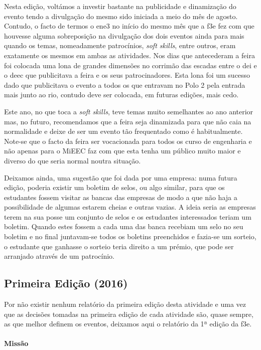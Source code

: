 Nesta edição, voltámos a investir bastante na publicidade e dinamização do evento tendo a divulgação do mesmo sido iniciada a meio do mês de agosto. Contudo, o facto de termos o \acrshort{ene3} no início do mesmo mês que a \acrshort{f3e} fez com que houvesse alguma sobreposição na divulgação dos dois eventos ainda para mais quando os temas, nomeadamente patrocínios, \textit{soft skills}, entre outros, eram exatamente os mesmos em ambas as atividades. Nos dias que antecederam a feira foi colocada uma lona de grandes dimensões no corrimão das escadas entre o \acrshort{dei} e o \acrshort{deec} que publicitava a feira e os seus patrocinadores. Esta lona foi um sucesso dado que publicitava o evento a todos os que entravam no Polo 2 pela entrada mais junto ao rio, contudo deve ser colocada, em futuras edições, mais cedo.

Este ano, no que toca a \textit{soft skills}, teve temas muito semelhantes ao ano anterior mas, no futuro, recomendamos que a feira seja dinamizada para que não caia na normalidade e deixe de ser um evento tão frequentado como é habitualmente. Note-se que o facto da feira ser vocacionada para todos os curso de engenharia e não apenas para o MiEEC faz com que esta tenha um público muito maior e diverso do que seria normal noutra situação.

Deixamos ainda, uma sugestão que foi dada por uma empresa: numa futura edição, poderia existir um boletim de selos, ou algo similar, para que os estudantes fossem visitar as bancas das empresas de modo a que não haja a possibilidade de algumas estarem cheias e outras vazias. A ideia seria as empresas terem na sua posse um conjunto de selos e os estudantes interessados teriam um boletim. Quando estes fossem a cada uma das banca recebiam um selo no seu boletim e no final juntavam-se todos os boletins preenchidos e fazia-se um sorteio, o estudante que ganhasse o sorteio teria direito a um prémio, que pode ser arranjado através de um patrocínio.

\subsection{Primeira Edição (2016)}

Por não existir nenhum relatório da primeira edição desta atividade e uma vez que as decisões tomadas na primeira edição de cada atividade são, quase sempre, as que melhor definem os eventos, deixamos aqui o relatório da 1ª edição da \acrshort{f3e}.

\paragraph{Missão}

